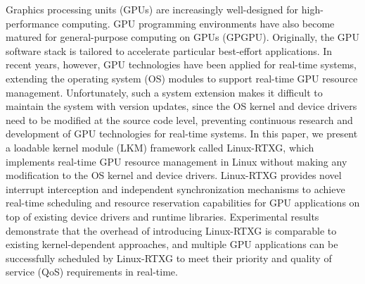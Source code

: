 Graphics processing units (GPUs) are increasingly well-designed for
high-performance computing.
GPU programming environments have also become matured for
general-purpose computing on GPUs (GPGPU).
Originally, the GPU software stack is tailored to accelerate
particular best-effort applications.
In recent years, however, GPU technologies have been applied for
real-time systems, extending the operating system (OS) modules to
support real-time GPU resource management.
Unfortunately, such a system extension makes it difficult to maintain
the system with version updates, since the OS kernel and device drivers
need to be modified at the source code level, preventing continuous
research and development of GPU technologies for real-time systems.
In this paper, we present a loadable kernel module (LKM) framework
called Linux-RTXG, which implements real-time GPU resource management in
Linux without making any modification to the OS kernel and device
drivers.
Linux-RTXG provides novel interrupt interception and independent
synchronization mechanisms to achieve real-time scheduling and resource
reservation capabilities for GPU applications on top of existing device
drivers and runtime libraries.
Experimental results demonstrate that the overhead of introducing
Linux-RTXG is comparable to existing kernel-dependent approaches, and
multiple GPU applications can be successfully scheduled by Linux-RTXG to
meet their priority and quality of service (QoS) requirements in
real-time.
